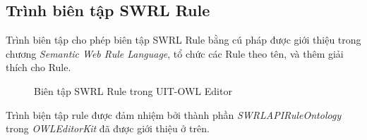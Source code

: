\subsection{Trình biên tập SWRL Rule}
Trình biên tập cho phép biên tập SWRL Rule bằng cú pháp được giới thiệu trong chương \textit{Semantic Web Rule Language}, tổ chức các Rule theo tên, và thêm giải thích cho Rule.
\begin{figure}[h!]
	\centering
	\caption{Biên tập SWRL Rule trong UIT-OWL Editor\label{overflow}}
\end{figure}
Trình biện tập rule được đảm nhiệm bởi thành phần \textit{SWRLAPIRuleOntology} trong \textit{OWLEditorKit} đã được giới thiệu ở trên.

